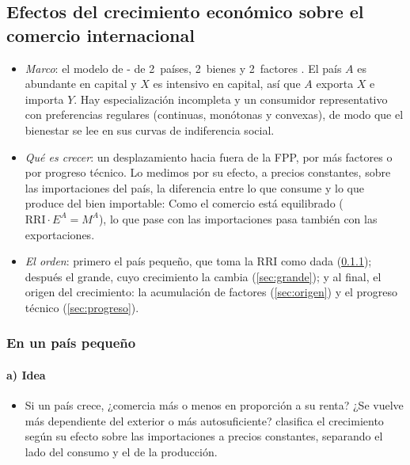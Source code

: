 \documentclass[11pt]{article}
\begin{document}
\subsection{Efectos del crecimiento económico sobre el comercio internacional}\label{sec:efectos}

\begin{itemize}
\item \emph{Marco}: el modelo de - de 2~países, 2~bienes y 2~factores . El país $A$ es abundante en capital y $X$ es intensivo en capital, así que $A$ exporta $X$ e importa $Y$. Hay especialización incompleta y un consumidor representativo con preferencias regulares (continuas, monótonas y convexas), de modo que el bienestar se lee en sus curvas de indiferencia social.
\item \emph{Qué es crecer}: un desplazamiento hacia fuera de la FPP, por más factores o por progreso técnico. Lo medimos por su efecto, a precios constantes, sobre las importaciones del país, la diferencia entre lo que consume y lo que produce del bien importable:
  Como el comercio está equilibrado ($\mathrm{RRI}\cdot E^A=M^A$), lo que pase con las importaciones pasa también con las exportaciones.
\item \emph{El orden}: primero el país pequeño, que toma la RRI como dada (\ref{sec:pequeno}); después el grande, cuyo crecimiento la cambia (\ref{sec:grande}); y al final, el origen del crecimiento: la acumulación de factores (\ref{sec:origen}) y el progreso técnico (\ref{sec:progreso}).
\end{itemize}

\subsubsection{En un país pequeño}\label{sec:pequeno}

\paragraph{a) Idea}

\begin{itemize}
\item Si un país crece, ¿comercia más o menos en proporción a su renta? ¿Se vuelve más dependiente del exterior o más autosuficiente? \textcite{Johnson1955Economic} clasifica el crecimiento según su efecto sobre las importaciones a precios constantes, separando el lado del consumo y el de la producción.
\end{itemize}
\end{document}

